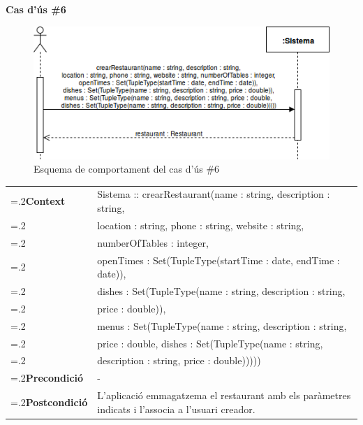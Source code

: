 \noindent\textbf{\large Cas d'ús \#6}\\
\begin{figure}[H]
\centering
\includegraphics[scale=0.6]{Figures/casdus_06.png}
\caption{Esquema de comportament del cas d'ús \#6}
\end{figure}
\begin{table}[h]
\noindent
\begin{tabularx}{\linewidth}{
>{\hsize=.2\hsize}X%
>{\hsize=0.8\hsize}X%
}
\textbf{Context} 		& Sistema :: crearRestaurant(name : string, description : string, \\
						& location : string, phone : string, website : string, \\
						& numberOfTables : integer, \\
						& openTimes : Set(TupleType(startTime : date, endTime : date)),\\
						& dishes : Set(TupleType(name : string, description : string, \\
						& price : double)), \\
						& menus : Set(TupleType(name : string, description : string, \\
						& price : double, dishes : Set(TupleType(name : string, \\
						& description : string, price : double))))) \\
\textbf{Precondició} 	& - \\
\textbf{Postcondició}	& L'aplicació emmagatzema el restaurant amb els paràmetres indicats i l'associa a l'usuari creador. \\
\end{tabularx}
\label{}
\end{table}


